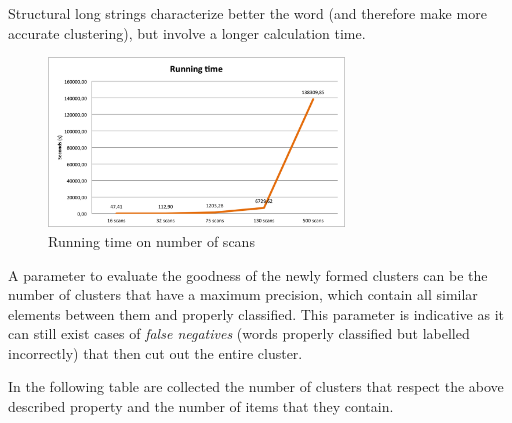 Structural long strings characterize better the word (and therefore make more accurate clustering), but involve a longer calculation time.

\begin{figure}[!htbp]
\centering
\includegraphics[width=0.7\textwidth]{images/esecuzione}
\caption{Running time on number of scans}
\label{fig:time}
\end{figure}

A parameter to evaluate the goodness of the newly formed clusters can be the number of clusters that have a maximum precision, which contain all similar elements between them and properly classified. This parameter is indicative as it can still exist cases of \emph{false negatives} (words properly classified but labelled incorrectly) that then cut out the entire cluster.

In the following table are collected the number of clusters that respect the above described property and the number of items that they contain. 

